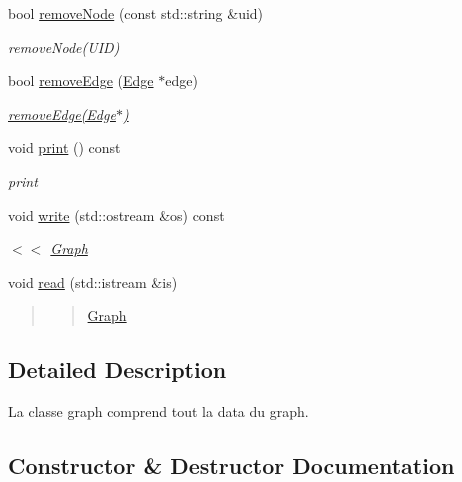 \begin{DoxyCompactItemize}
bool \mbox{\hyperlink{class_graph_a1c30c580ccc957167dc64ca1a9e19248}{remove\+Node}} (const std\+::string \&uid)
\begin{DoxyCompactList}\small\item\em remove\+Node(\+U\+I\+D) \end{DoxyCompactList}\item 
bool \mbox{\hyperlink{class_graph_a97b5c94aeef2c0bea6a3f424b0fc01b8}{remove\+Edge}} (\mbox{\hyperlink{class_edge}{Edge}} $\ast$edge)
\begin{DoxyCompactList}\small\item\em \mbox{\hyperlink{class_graph_a97b5c94aeef2c0bea6a3f424b0fc01b8}{remove\+Edge(\+Edge$\ast$)}} \end{DoxyCompactList}\item 
void \mbox{\hyperlink{class_graph_aeeede3cb48be5d8cac08ea05ce54bd52}{print}} () const
\begin{DoxyCompactList}\small\item\em print \end{DoxyCompactList}\item 
void \mbox{\hyperlink{class_graph_aada8884f6aea111f9b36d8dfb3e5c0a9}{write}} (std\+::ostream \&os) const
\begin{DoxyCompactList}\small\item\em $<$$<$ \mbox{\hyperlink{class_graph}{Graph}} \end{DoxyCompactList}\item 
void \mbox{\hyperlink{class_graph_a79b39cf3963c03095bb74017a23c145e}{read}} (std\+::istream \&is)
\begin{DoxyCompactList}\small\item\em \begin{quote}
\begin{quote}
\mbox{\hyperlink{class_graph}{Graph}}\end{quote}
\end{quote}
\end{DoxyCompactList}\end{DoxyCompactItemize}


\subsection{Detailed Description}
La classe graph comprend tout la data du graph. 

\subsection{Constructor \& Destructor Documentation}
\mbox{\label{class_graph_ae4c72b8ac4d693c49800a4c7e273654f}} 
